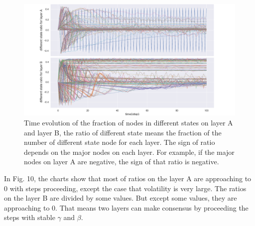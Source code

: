 \documentclass[english]{cccconf}
\begin{document}
\begin{figure}[!htb]
  \centering
  \includegraphics[width=\hsize]{FIG10.png}
  \caption{Time evolution of the fraction of nodes in different states on layer A and layer B, the ratio of different state means the fraction of the number of different state node for each layer. The sign of ratio depends on the major nodes on each layer. For example, if the major nodes on layer A are negative, the sign of that ratio is negative.}
  \label{Fig10}
\end{figure}
In Fig. 10, the charts show that most of ratios on the layer A are approaching to 0 with steps proceeding, except the case that volatility is very large. The ratios on the layer B are divided by some values. But except some values, they are approaching to 0. That means two layers can make consensus by proceeding the steps with stable $\gamma$ and $\beta$. 
\end{document}
